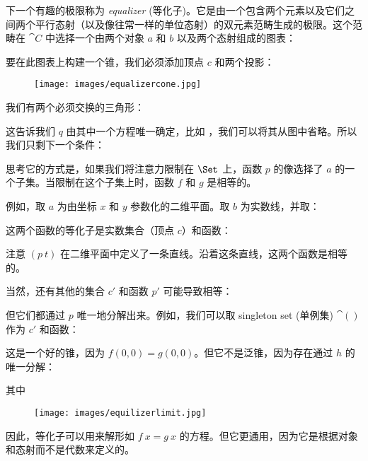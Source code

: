 下一个有趣的极限称为 \emph{equalizer} (等化子)。它是由一个包含两个元素以及它们之间两个平行态射（以及像往常一样的单位态射）的双元素范畴生成的极限。这个范畴在 $\cat{C}$ 中选择一个由两个对象 $a$ 和 $b$ 以及两个态射组成的图表：


要在此图表上构建一个锥，我们必须添加顶点 $c$ 和两个投影：


\begin{figure}[H]
  \centering
  \texttt{[image: images/equalizercone.jpg]}
\end{figure}

\noindent
我们有两个必须交换的三角形：


这告诉我们 $q$ 由其中一个方程唯一确定，比如 ，我们可以将其从图中省略。所以我们只剩下一个条件：


思考它的方式是，如果我们将注意力限制在 $\Set$ 上，函数 $p$ 的像选择了 $a$ 的一个子集。当限制在这个子集上时，函数 $f$ 和 $g$ 是相等的。

例如，取 $a$ 为由坐标 $x$ 和 $y$ 参数化的二维平面。取 $b$ 为实数线，并取：


这两个函数的等化子是实数集合（顶点 $c$）和函数：


注意 $(p~t)$ 在二维平面中定义了一条直线。沿着这条直线，这两个函数是相等的。

当然，还有其他的集合 $c'$ 和函数 $p'$ 可能导致相等：


但它们都通过 $p$ 唯一地分解出来。例如，我们可以取 singleton set (单例集) $\cat{()}$ 作为 $c'$ 和函数：


这是一个好的锥，因为 $f (0, 0) = g (0, 0)$。但它不是泛锥，因为存在通过 $h$ 的唯一分解：


其中


\begin{figure}[H]
  \centering
  \texttt{[image: images/equilizerlimit.jpg]}
\end{figure}

\noindent
因此，等化子可以用来解形如 $f~x = g~x$ 的方程。但它更通用，因为它是根据对象和态射而不是代数来定义的。

